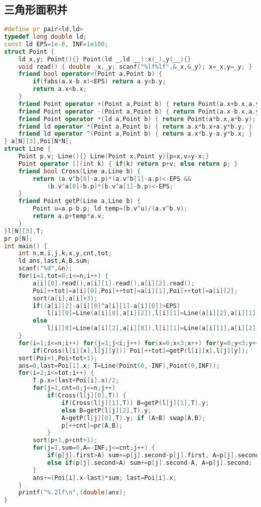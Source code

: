 \documentclass[landscape,a4paper]{article}
\begin{document}
\subsection{三角形面积并}
\begin{lstlisting}[language=C++]
#define pr pair<ld,ld>
typedef long double ld;
const ld EPS=1e-8, INF=1e100;
struct Point {
	ld x,y; Point(){} Point(ld _,ld __):x(_),y(__){}
	void read() { double _x,_y; scanf("%lf%lf",&_x,&_y); x=_x,y=_y; }
	friend bool operator<(Point a,Point b) {
		if(fabs(a.x-b.x)<EPS) return a.y<b.y;
        return a.x<b.x;
    }
	friend Point operator +(Point a,Point b) { return Point(a.x+b.x,a.y+b.y); }
	friend Point operator -(Point a,Point b) { return Point(a.x-b.x,a.y-b.y); }
	friend Point operator *(ld a,Point b) { return Point(a*b.x,a*b.y); }
	friend ld operator *(Point a,Point b) { return a.x*b.x+a.y*b.y; }
	friend ld operator ^(Point a,Point b) { return a.x*b.y-a.y*b.x; }
} a[N][3],Poi[N*N];
struct Line {
    Point p,v; Line(){} Line(Point x,Point y){p=x,v=y-x;}
	Point operator [](int k) { if(k) return p+v; else return p; }
	friend bool Cross(Line a,Line b) {
		return (a.v^b[0]-a.p)*(a.v^b[1]-a.p)<-EPS &&
			(b.v^a[0]-b.p)*(b.v^a[1]-b.p)<-EPS;
	}
	friend Point getP(Line a,Line b) {
		Point u=a.p-b.p; ld temp=(b.v^u)/(a.v^b.v);
		return a.p+temp*a.v;
	}
}l[N][3],T;
pr p[N];
int main() {
	int n,m,i,j,k,x,y,cnt,tot;
	ld ans,last,A,B,sum;
	scanf("%d",&n);
	for(i=1,tot=0;i<=n;i++) {
		a[i][0].read(),a[i][1].read(),a[i][2].read();
		Poi[++tot]=a[i][0],Poi[++tot]=a[i][1],Poi[++tot]=a[i][2];
		sort(a[i],a[i]+3);
		if((a[i][2]-a[i][0]^a[i][1]-a[i][0])>EPS)
			l[i][0]=Line(a[i][0],a[i][2]),l[i][1]=Line(a[i][2],a[i][1]),l[i][2]=Line(a[i][1],a[i][0]);
		else
			l[i][0]=Line(a[i][2],a[i][0]),l[i][1]=Line(a[i][1],a[i][2]),l[i][2]=Line(a[i][0],a[i][1]);
    }
	for(i=1;i<=n;i++) for(j=1;j<i;j++) for(x=0;x<3;x++) for(y=0;y<3;y++)
		if(Cross(l[i][x],l[j][y])) Poi[++tot]=getP(l[i][x],l[j][y]);
	sort(Poi+1,Poi+tot+1);
	ans=0,last=Poi[1].x; T=Line(Point(0,-INF),Point(0,INF));
	for(i=2;i<=tot;i++) {
        T.p.x=(last+Poi[i].x)/2;
        for(j=1,cnt=0;j<=n;j++)
            if(Cross(l[j][0],T)) {
                if(Cross(l[j][1],T)) B=getP(l[j][1],T).y;
                else B=getP(l[j][2],T).y;
                A=getP(l[j][0],T).y; if (A>B) swap(A,B);
                p[++cnt]=pr(A,B);
            }
        sort(p+1,p+cnt+1);
        for(j=1,sum=0,A=-INF;j<=cnt;j++) {
            if(p[j].first>A) sum+=p[j].second-p[j].first, A=p[j].second;
            else if(p[j].second>A) sum+=p[j].second-A, A=p[j].second;
        }
		ans+=(Poi[i].x-last)*sum; last=Poi[i].x;
	}
	printf("%.2lf\n",(double)ans);
}
\end{lstlisting}
\end{document}
